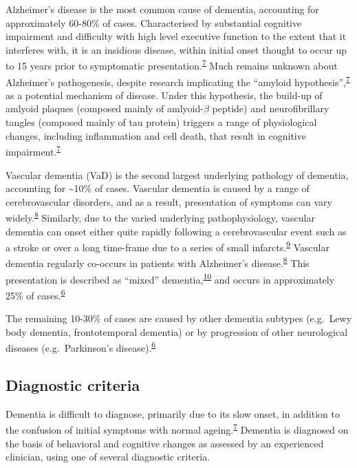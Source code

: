\documentclass[a4paper, twoside]{templates/ociamthesis}
\begin{document}
Alzheimer's disease is the most common cause of dementia, accounting for approximately 60-80\% of cases. Characterised by substantial cognitive impairment and difficulty with high level executive function to the extent that it interferes with, it is an insidious disease, within initial onset thought to occur up to 15 years prior to symptomatic presentation.\textsuperscript{\protect\hyperlink{ref-robinson2015}{7}} Much remains unknown about Alzheimer's pathogenesis, despite research implicating the ``amyloid hypothesis'',\textsuperscript{\protect\hyperlink{ref-robinson2015}{7}} as a potential mechanism of disease. Under this hypothesis, the build-up of amlyoid plaques (composed mainly of amlyoid-\(\beta\) peptide) and neurofibrillary tangles (composed mainly of tau protein) triggers a range of physiological changes, including inflammation and cell death, that result in cognitive impairment.\textsuperscript{\protect\hyperlink{ref-robinson2015}{7}}

Vascular dementia (VaD) is the second largest underlying pathology of dementia, accounting for \textasciitilde10\% of cases. Vascular dementia is caused by a range of cerebrovascular disorders, and as a result, presentation of symptoms can vary widely.\textsuperscript{\protect\hyperlink{ref-iadecola2013}{8}} Similarly, due to the varied underlying pathophysiology, vascular dementia can onset either quite rapidly following a cerebrovascular event such as a stroke or over a long time-frame due to a series of small infarcts.\textsuperscript{\protect\hyperlink{ref-venkat2015}{9}} Vascular dementia regularly co-occurs in patients with Alzheimer's disease.\textsuperscript{\protect\hyperlink{ref-iadecola2013}{8}} This presentation is described as ``mixed'' dementia,\textsuperscript{\protect\hyperlink{ref-custodio2017}{10}} and occurs in approximately 25\% of cases.\textsuperscript{\protect\hyperlink{ref-burns2009}{6}}

The remaining 10-30\% of cases are caused by other dementia subtypes (e.g.~Lewy body dementia, frontotemporal dementia) or by progression of other neurological diseases (e.g.~Parkinson's disease).\textsuperscript{\protect\hyperlink{ref-burns2009}{6}}

\hypertarget{diagnostic-criteria}{%
\subsection{Diagnostic criteria}\label{diagnostic-criteria}}

Dementia is difficult to diagnose, primarily due to its slow onset, in addition to the confusion of initial symptoms with normal ageing.\textsuperscript{\protect\hyperlink{ref-robinson2015}{7}} Dementia is diagnosed on the basis of behavioral and cognitive changes as assessed by an experienced clinician, using one of several diagnostic criteria.
\end{document}
